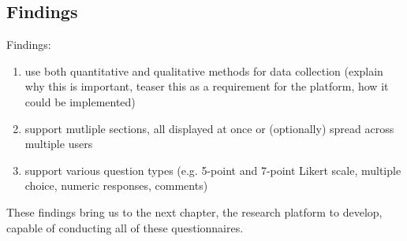 




\subsection{Findings}


	Findings: 
	\begin{enumerate}
	\item use both quantitative and qualitative methods for data collection (explain why this is important, teaser this as a requirement for the platform, how it could be implemented)
	\item support mutliple sections, all displayed at once or (optionally) spread across multiple users
	\item support various question types (e.g. 5-point and 7-point Likert scale, multiple choice, numeric responses, comments)
	\end{enumerate}




	These findings bring us to the next chapter, the research platform to develop, capable of conducting all of these questionnaires.

















